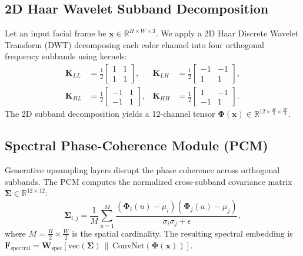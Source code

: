 \documentclass[journal]{IEEEtran}
\begin{document}
\subsection{2D Haar Wavelet Subband Decomposition}
Let an input facial frame be $\mathbf{x} \in \mathbb{R}^{H \times W \times 3}$. We apply a 2D Haar Discrete Wavelet Transform (DWT) decomposing each color channel into four orthogonal frequency subbands using kernels:
\begin{align}
\mathbf{K}_{LL} &= \frac{1}{2}\begin{bmatrix} 1 & 1 \\ 1 & 1 \end{bmatrix}, &
\mathbf{K}_{LH} &= \frac{1}{2}\begin{bmatrix} -1 & -1 \\ 1 & 1 \end{bmatrix}, \\
\mathbf{K}_{HL} &= \frac{1}{2}\begin{bmatrix} -1 & 1 \\ -1 & 1 \end{bmatrix}, &
\mathbf{K}_{HH} &= \frac{1}{2}\begin{bmatrix} 1 & -1 \\ -1 & 1 \end{bmatrix}.
\end{align}
The 2D subband decomposition yields a 12-channel tensor $\mathbf{\Phi}(\mathbf{x}) \in \mathbb{R}^{12 \times \frac{H}{2} \times \frac{W}{2}}$.

\subsection{Spectral Phase-Coherence Module (PCM)}
Generative upsampling layers disrupt the phase coherence across orthogonal subbands. The PCM computes the normalized cross-subband covariance matrix $\mathbf{\Sigma} \in \mathbb{R}^{12 \times 12}$:
\begin{equation}
\mathbf{\Sigma}_{i, j} = \frac{1}{M} \sum_{u=1}^{M} \frac{\left( \mathbf{\Phi}_i(u) - \mu_i \right) \left( \mathbf{\Phi}_j(u) - \mu_j \right)}{\sigma_i \sigma_j + \epsilon},
\end{equation}
where $M = \frac{H}{2} \times \frac{W}{2}$ is the spatial cardinality. The resulting spectral embedding is $\mathbf{F}_{\text{spectral}} = \mathbf{W}_{\text{spec}} [\text{vec}(\mathbf{\Sigma}) \,\|\, \text{ConvNet}(\mathbf{\Phi}(\mathbf{x}))]$.
\end{document}
